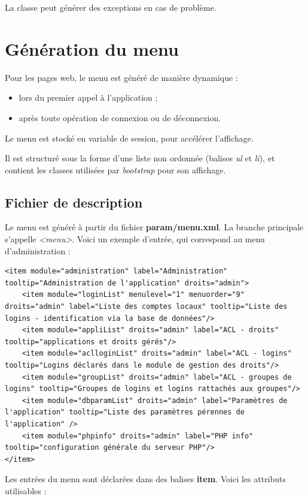 La classe peut générer des exceptions en cas de problème.

\chapter{Génération du menu}
Pour les pages web, le menu est généré de manière dynamique :
\begin{itemize}
\item lors du premier appel à l'application ;
\item après toute opération de connexion ou de déconnexion.
\end{itemize}

Le menu est stocké en variable de session, pour accélérer l'affichage.

Il est structuré sous la forme d'une liste non ordonnée (balises \textit{ul} et \textit{li}), et contient les classes utilisées par \textit{bootstrap} pour son affichage.

\section{Fichier de description}

Le menu est généré à partir du fichier \textbf{param/menu.xml}. La branche principale s'appelle \textit{<menu>}. Voici un exemple d'entrée, qui correspond au menu d'administration :

\begin{lstlisting}
<item module="administration" label="Administration" tooltip="Administration de l'application" droits="admin">
	<item module="loginList" menulevel="1" menuorder="9" droits="admin" label="Liste des comptes locaux" tooltip="Liste des logins - identification via la base de données"/>
	<item module="appliList" droits="admin" label="ACL - droits" tooltip="applications et droits gérés"/>
	<item module="aclloginList" droits="admin" label="ACL - logins" tooltip="Logins déclarés dans le module de gestion des droits"/>
	<item module="groupList" droits="admin" label="ACL - groupes de logins" tooltip="Groupes de logins et logins rattachés aux groupes"/>
	<item module="dbparamList" droits="admin" label="Paramètres de l'application" tooltip="Liste des paramètres pérennes de l'application" />
	<item module="phpinfo" droits="admin" label="PHP info" tooltip="configuration générale du serveur PHP"/>
</item>
\end{lstlisting}

Les entrées du menu sont déclarées dans des balises \textbf{item}. Voici les attributs utilisables :

